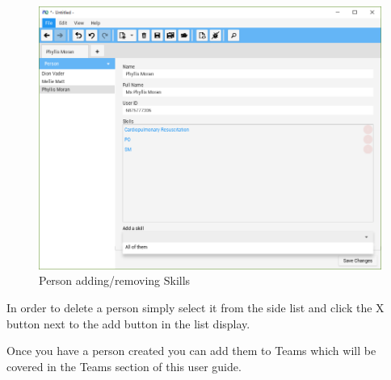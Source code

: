 \begin{figure}[H]
\centering
\includegraphics[width=\textwidth]{images/screenshots/people3.PNG}
\caption{Person adding/removing Skills}
\label{fig:new_project}
\end{figure}

In order to delete a person simply select it from the side list and click the X button next to the add button in the list display.

Once you have a person created you can add them to Teams which will be covered in the Teams section of this user guide.